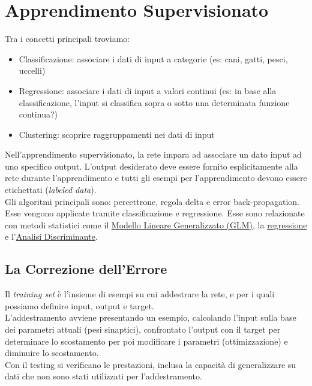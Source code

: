 \newpage
\section{Apprendimento Supervisionato}
Tra i concetti principali troviamo:
\begin{itemize}
    \item Classificazione: associare i dati di input a categorie (es: cani, gatti, pesci, uccelli)
    \item Regressione: associare i dati di input a valori continui (es: in base alla classificazione, l'input si classifica sopra o sotto una determinata funzione continua?)
    \item Clustering: scoprire raggruppamenti nei dati di input
\end{itemize}

Nell'apprendimento supervisionato, la rete impara ad associare un dato input ad uno specifico output. L'output desiderato deve essere fornito esplicitamente alla rete durante l'apprendimento e tutti gli esempi per l'apprendimento devono essere etichettati (\textit{labeled data}).\\
Gli algoritmi principali sono: percettrone, regola delta e error back-propagation. Esse vengono applicate tramite classificazione e regressione. Esse sono relazionate con metodi statistici come il \href{https://it.wikipedia.org/wiki/Modello_lineare_generalizzato}{Modello Lineare Generalizzato (GLM)}, la \href{https://it.wikipedia.org/wiki/Regressione_lineare}{regressione} e l'\href{https://it.wikipedia.org/wiki/Analisi_discriminante}{Analisi Discriminante}.

\subsection{La Correzione dell'Errore}
Il \textit{training set} è l'insieme di esempi su cui addestrare la rete, e per i quali possiamo definire input, output e target.\\
L'addestramento avviene presentando un esempio, calcolando l'input sulla base dei parametri attuali (pesi sinaptici), confrontato l'output con il target per determinare lo scostamento per poi modificare i parametri (ottimizzazione) e diminuire lo scostamento.\\
Con il testing si verificano le prestazioni, inclusa la capacità di generalizzare su dati che non sono stati utilizzati per l'addestramento.

